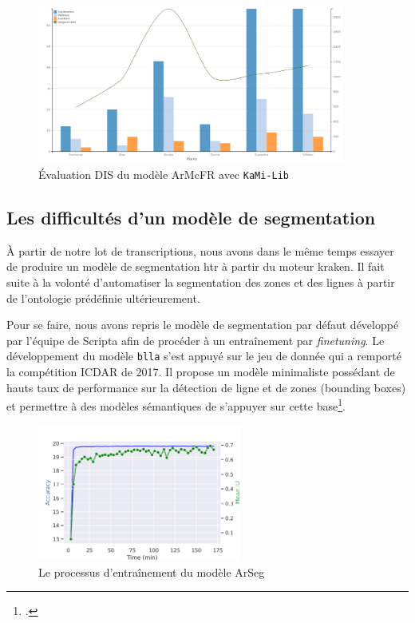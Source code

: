     \begin{figure}[H]
	    \centering
	    \includegraphics[width=0.9\textwidth]{annexes/graph/DIS_htr.png}
	    \caption{Évaluation \gls{DIS} du modèle ArMcFR avec \texttt{KaMi-Lib}}
	    \label{fig:dis_htr}
	\end{figure}
	
	
	\subsection{Les difficultés d'un modèle de segmentation}
	
	À partir de notre lot de transcriptions, nous avons dans le même temps essayer de produire un modèle de segmentation \gls{htr} à partir du moteur \gls{kraken}. Il fait suite à la volonté d'automatiser la segmentation des zones et des lignes à partir de l'ontologie prédéfinie ultérieurement.
	
	Pour se faire, nous avons repris le modèle de segmentation par défaut développé par l'équipe de Scripta afin de procéder à un entraînement par \textit{finetuning}. Le développement du modèle \texttt{blla} s'est appuyé sur le jeu de donnée qui a remporté la compétition ICDAR de 2017. Il propose un modèle minimaliste possédant de hauts taux de performance sur la détection de ligne et de zones (bounding boxes) et permettre à des modèles sémantiques de s'appuyer sur cette base\footcite{kiesslingBADAMPublicDataset2019}.
	
	\begin{figure}
	    \centering
	    \includegraphics[width=0.6\textwidth]{annexes/graph/epoch_segtrain.png}
	    \caption{Le processus d'entraînement du modèle ArSeg}
	    \label{fig:epoch_mode}
	\end{figure}
	
